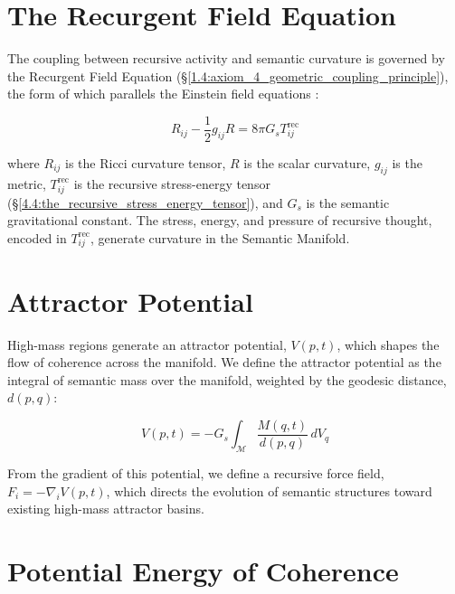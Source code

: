 \section{The Recurgent Field Equation}
\label{5.3:the_recurgent_field_equation}

The coupling between recursive activity and semantic curvature is governed by the Recurgent Field Equation (\S\ref{1.4:axiom_4_geometric_coupling_principle}), the form of which parallels the Einstein field equations \autocite{Einstein1915, MisnerThorneWheeler1973, Wald1984}:

\begin{equation}
R_{ij} - \frac{1}{2}g_{ij}R = 8\pi G_s T^{\text{rec}}_{ij}
\end{equation}

where \(R_{ij}\) is the Ricci curvature tensor, \(R\) is the scalar curvature, \(g_{ij}\) is the metric, \(T^{\text{rec}}_{ij}\) is the recursive stress-energy tensor (\S\ref{4.4:the_recursive_stress_energy_tensor}), and \(G_s\) is the semantic gravitational constant. The stress, energy, and pressure of recursive thought, encoded in \(T^{\text{rec}}_{ij}\), generate curvature in the Semantic Manifold.


\section{Attractor Potential}
\label{5.4:attractor_potential}

High-mass regions generate an attractor potential, \(V(p,t)\), which shapes the flow of coherence across the manifold. We define the attractor potential as the integral of semantic mass over the manifold, weighted by the geodesic distance, \(d(p, q)\):

\begin{equation}
V(p, t) = -G_s \int_{\mathcal{M}} \frac{M(q, t)}{d(p, q)} \, dV_q
\end{equation}

From the gradient of this potential, we define a recursive force field, \(F_i = -\nabla_i V(p,t)\), which directs the evolution of semantic structures toward existing high-mass attractor basins.


\section{Potential Energy of Coherence}
\label{5.5:potential_energy_of_coherence}

